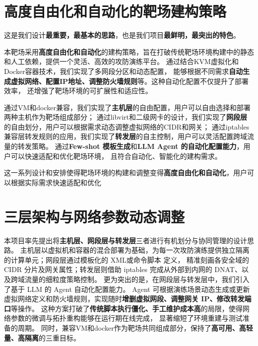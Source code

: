 \documentclass[lang=cn,10pt]{elegantbook}
\begin{document}
\section{高度自由化和自动化的靶场建构策略}
这是我们设计\textbf{最重要，最基本的思路}，也是我们项目\textbf{最鲜明，最突出的特色}。

本靶场采用\textbf{高度自由化和自动化}的建构策略，旨在打破传统靶场环境构建中的静态和人工依赖，提供一个灵活、高效的攻防演练平台。
通过结合KVM虚拟化和Docker容器技术，我们实现了多网段分区和动态配置，
能够根据不同需求\textbf{自动生成虚拟网络、配置IP地址、调整防火墙规则}等。这种自动化配置不仅提升了部署效率，
还增强了靶场环境的可扩展性和适应性。

通过VM和docker兼容，我们实现了\textbf{主机层}的自由配置，用户可以自由选择和部署两种主机作为靶场组成部分；
通过libvirt和二级网卡的设计，我们实现了\textbf{网段层}的自由划分，用户可以根据需求动态调整虚拟网络的CIDR和网关；
通过iptables兼容层转发规则的应用，我们实现了\textbf{转发层}的自主控制，用户可以灵活配置跨域流量的转发策略。
通过\textbf{Few-shot 模板生成}和\textbf{LLM Agent 的自动化配置能力}，用户可以快速适配和优化靶场环境，
且符合自动化、智能化的建构需求。


这一系列设计和安排使得靶场环境的构建和调整变得\textbf{高度自由化和自动化}，用户可以根据实际需求快速适配和优化




\section{三层架构与网络参数动态调整}  
本项目率先提出将\textbf{主机层、网段层与转发层}三者进行有机划分与协同管理的设计思路。
主机层以虚拟机和容器的混合部署为基础，为每一次攻防演练提供独立隔离的计算单元；网段层通过模板化的 XML或命令脚本 定义，
精准刻画各安全域的 CIDR 分片及网关属性；转发层则借助 iptables 完成从外部到内网的 DNAT、以及跨域流量的细粒度策略控制。
更为突出的是，在网段层与转发层中，我们引入了基于 LLM 的 Agent 自动化配置能力。
Agent 可根据演练场景动态生成或更新虚拟网络定义和防火墙规则，实现随时\textbf{增删虚拟网段、调整网关 IP、修改转发端口}等操作。
这种方案打破了\textbf{传统脚本执行僵化、手工维护成本高}的局限，使得网络参数的微调与拓扑重构能够在运行期在线完成，
显著缩短了环境重建与测试准备的周期。
同时，兼容VM和docker作为靶场共同组成部分，保持了\textbf{高可用、高轻量、高隔离}的三重目标。
\end{document}
